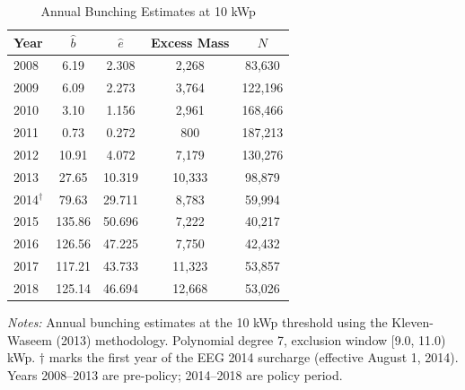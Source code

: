 \begin{table}[htbp]
\centering
\caption{Annual Bunching Estimates at 10 kWp}
\label{tab:annual}
\begin{tabular}{lcccc}
\hline\hline
Year & $\hat{b}$ & $\hat{e}$ & Excess Mass & $N$ \\
\hline
2008 & 6.19 & 2.308 & 2,268 & 83,630 \\
2009 & 6.09 & 2.273 & 3,764 & 122,196 \\
2010 & 3.10 & 1.156 & 2,961 & 168,466 \\
2011 & 0.73 & 0.272 & 800 & 187,213 \\
2012 & 10.91 & 4.072 & 7,179 & 130,276 \\
2013 & 27.65 & 10.319 & 10,333 & 98,879 \\
2014$^{\dagger}$ & 79.63 & 29.711 & 8,783 & 59,994 \\
2015 & 135.86 & 50.696 & 7,222 & 40,217 \\
2016 & 126.56 & 47.225 & 7,750 & 42,432 \\
2017 & 117.21 & 43.733 & 11,323 & 53,857 \\
2018 & 125.14 & 46.694 & 12,668 & 53,026 \\
\hline\hline
\end{tabular}
\begin{tablenotes}
\small
\item \textit{Notes:} Annual bunching estimates at the 10 kWp threshold using the Kleven-Waseem (2013) methodology. Polynomial degree 7, exclusion window [9.0, 11.0) kWp. $\dagger$ marks the first year of the EEG 2014 surcharge (effective August 1, 2014). Years 2008--2013 are pre-policy; 2014--2018 are policy period.
\end{tablenotes}
\end{table}
